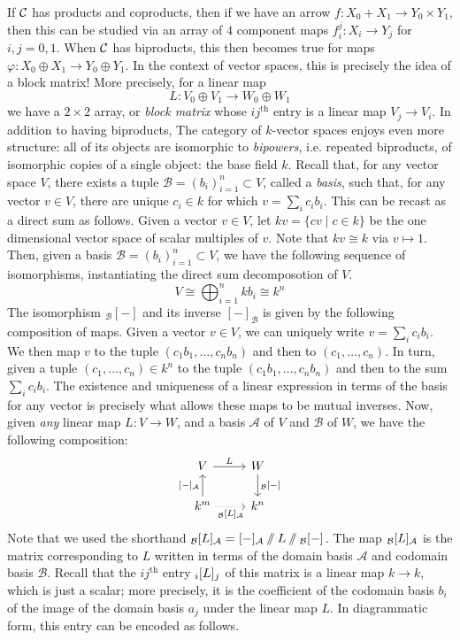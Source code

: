 If $\mathcal{C}$ has products and coproducts, then if we have an arrow $f:X_0+ X_1\to Y_0\times Y_1$, then this can be studied via an array of $4$ component maps $f_i^j:X_i\to Y_j$ for $i,j=0,1$. When $\mathcal{C}$ has biproducts, this then becomes true for maps $\varphi:X_0\oplus X_1\to Y_0\oplus Y_1$. In the context of vector spaces, this is precisely the idea of a block matrix! More precisely, for a linear map 
\[L:V_0\oplus V_1\to W_0\oplus W_1\] we have a $2\times 2$ array, or \emph{block matrix} whose $ij^\text{th}$ entry is a linear map $V_j\to V_i$. In addition to having biproducts, The category of $k$-vector spaces enjoys even more structure: all of its objects are isomorphic to \emph{bipowers}, i.e. repeated biproducts, of isomorphic copies of a single object: the base field $k$. Recall that, for any vector space $V$, there exists a tuple $\mathcal{B}=(b_i)_{i=1}^n\subset V$, called a \emph{basis}, such that, for any vector $v\in V$, there are unique $c_i\in k$ for which $v=\textstyle\sum_i c_ib_i$. This can be recast as a direct sum as follows. Given a vector $v\in V$, let $kv=\{cv\mid c\in k\}$ be the one dimensional vector space of scalar multiples of $v$. Note that $kv\cong k$ via $v\mapsto 1$. Then, given a basis $\mathcal{B}=(b_i)_{i=1}^n\subset V$, we have the following sequence of isomorphisms, instantiating the direct sum decomposotion of $V$.
\[V \cong \bigoplus_{i=1}^nkb_i\cong k^n\]
The isomorphism ${}_{\mathcal{B}}[-]$ and its inverse $[-]_{\mathcal{B}}$ is given by the following composition of maps. Given a vector $v\in V$, we can uniquely write $v=\sum_ic_ib_i$. We then map $v$ to the tuple $(c_1b_1,\dots,c_nb_n)$ and then to $(c_1,\dots,c_n)$. In turn, given a tuple $(c_1,\dots,c_n)\in k^n$ to the tuple $(c_1b_1,\dots,c_nb_n)$ and then to the sum $\sum_ic_ib_i$. The existence and uniqueness of a linear expression in terms of the basis for any vector is precisely what allows these maps to be mutual inverses. Now, given \emph{any} linear map $L:V\to W$, and a basis $\mathcal{A}$ of $V$ and $\mathcal{B}$ of $W$, we have the following composition: 
\[
\begin{tikzcd}
V \arrow[r,"L"] & W \arrow[d,"\mtrx{\mathcal{B}}{-}{}"] \\
k^m \arrow[u,"\mtrx{}{-}{\mathcal{A}}"] \arrow[r,dotted,"\mtrx{\mathcal{B}}{L}{\mathcal{A}}"'] & k^n
\end{tikzcd}
\]
Note that we used the shorthand ${}_{\mathcal{B}}[L]_{\mathcal{A}}={}_{}[-]_{\mathcal{A}}\sslash L\sslash {}_{\mathcal{B}}[-]_{}$. The map ${}_{\mathcal{B}}[L]_{\mathcal{A}}$ is the matrix corresponding to $L$ written in terms of the domain basis $\mathcal{A}$ and codomain basis $\mathcal{B}$. Recall that the $ij^\text{th}$ entry ${}_{i}[L]_{j}$ of this matrix is a linear map $k\to k$, which is just a scalar; more precisely, it is the coefficient of the codomain basis $b_i$ of the image of the domain basis $a_j$ under the linear map $L$. In diagrammatic form, this entry can be encoded as follows.

